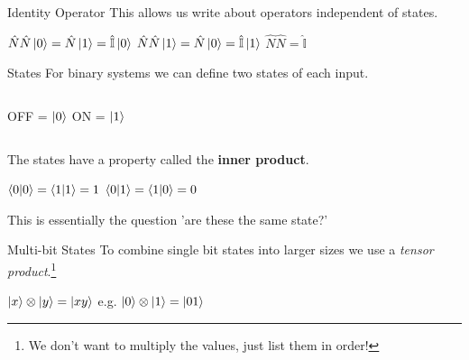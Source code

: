 \documentclass{beamer}
\begin{document}
\begin{frame}{Identity Operator}
    This allows us write about operators independent of states.
    \vfill

\centering
    \begin{math}
        \hat{N}\hat{N}\ket{0} = \hat{N}\ket{1} = \hat{\mathbb{I}}\ket{0}
    \end{math}\vfill
    \begin{math}
        \hat{N}\hat{N}\ket{1} = \hat{N}\ket{0} = \hat{\mathbb{I}}\ket{1}
    \end{math}\vfill
    \begin{math}
        \hat{N}\hat{N} = \hat{\mathbb{I}}
    \end{math}
\end{frame}

\begin{frame}{States}
    For binary systems we can define two states of each input.\vfill
    \begin{columns}
        \centering
        OFF = $\ket{0}$
        \centering
        ON = $\ket{1}$
    \end{columns}\vfill    
    \pause
    The states have a property called the \textbf{inner product}.\vfill
    \pause
    \begin{center}
    \begin{math}
        \braket{0}{0} = \braket{1}{1} = 1
    \end{math}\vfill
    \begin{math}
        \braket{0}{1} = \braket{1}{0} = 0
    \end{math}\vfill
    \end{center}
    \pause
    This is essentially the question 'are these the same state?'
\end{frame}

\begin{frame}{Multi-bit States}
To combine single bit states into larger sizes we use a \emph{tensor product}.\footnote{We don't want to multiply the values, just list them in order!}\vfill

\centering
\begin{math}
    \ket{x} \otimes \ket{y}
    = \ket{xy}
\end{math}\vfill
    e.g.
\begin{math}
    \ket{0} \otimes \ket{1}
    = \ket{01}
\end{math}\vfill
\end{frame}
\end{document}
